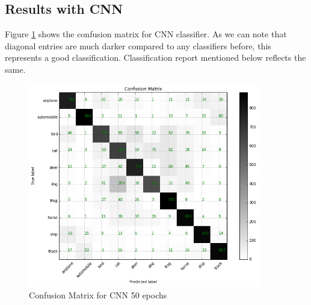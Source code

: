 \documentclass[12pt]{article}
\begin{document}
\subsection{Results with CNN}
Figure \ref{img:cnn_cm} shows the confusion matrix for CNN classifier. As we can note that diagonal entries are much darker compared to any classifiers before, this represents a good classification. Classification report mentioned below reflects the same.
\begin{figure}[H]
\centering
\includegraphics[width=0.9\textwidth]{images/cnn_cm.png} 
\caption{Confusion Matrix for CNN 50 epochs}
\label{img:cnn_cm}
\end{figure}
\end{document}
